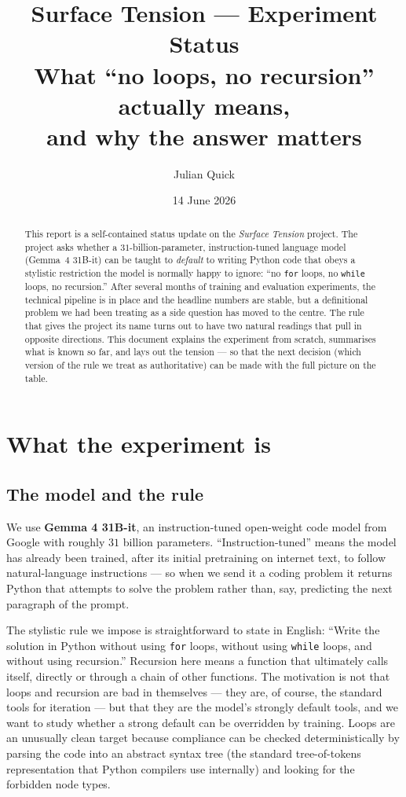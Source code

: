 \documentclass[11pt]{article}
\title{Surface Tension --- Experiment Status\\
       \large What ``no loops, no recursion'' actually means,\\
              and why the answer matters}
\author{Julian Quick}
\date{14 June 2026}
\begin{document}
\maketitle

\begin{abstract}
This report is a self-contained status update on the \emph{Surface Tension}
project. The project asks whether a $31$-billion-parameter, instruction-tuned
language model (Gemma~4 31B-it) can be taught to \emph{default} to writing
Python code that obeys a stylistic restriction the model is normally happy to
ignore: ``no \texttt{for} loops, no \texttt{while} loops, no recursion.''
After several months of training and evaluation experiments, the technical
pipeline is in place and the headline numbers are stable, but a definitional
problem we had been treating as a side question has moved to the centre. The
rule that gives the project its name turns out to have two natural readings
that pull in opposite directions. This document explains the experiment from
scratch, summarises what is known so far, and lays out the tension --- so
that the next decision (which version of the rule we treat as authoritative)
can be made with the full picture on the table.
\end{abstract}

\section{What the experiment is}
\label{sec:setup}

\subsection{The model and the rule}

We use \textbf{Gemma 4 31B-it}, an instruction-tuned open-weight code model
from Google with roughly $31$ billion parameters. ``Instruction-tuned'' means
the model has already been trained, after its initial pretraining on internet
text, to follow natural-language instructions --- so when we send it a coding
problem it returns Python that attempts to solve the problem rather than, say,
predicting the next paragraph of the prompt.

The stylistic rule we impose is straightforward to state in English: ``Write
the solution in Python without using \texttt{for} loops, without using
\texttt{while} loops, and without using recursion.'' Recursion here means
a function that ultimately calls itself, directly or through a chain of other
functions. The motivation is not that loops and recursion are bad in
themselves --- they are, of course, the standard tools for iteration --- but
that they are the model's strongly default tools, and we want to study whether
a strong default can be overridden by training. Loops are an unusually clean
target because compliance can be checked deterministically by parsing the code
into an abstract syntax tree (the standard tree-of-tokens representation that
Python compilers use internally) and looking for the forbidden node types.
\end{document}
